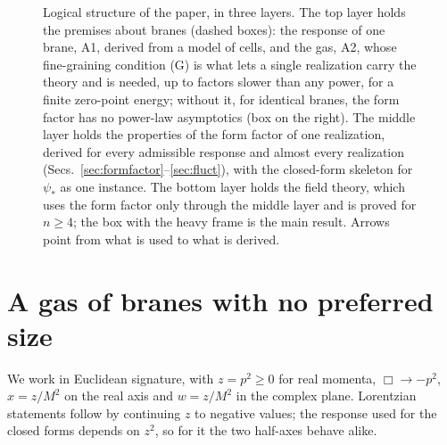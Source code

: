 \documentclass[aps,prd,10pt,twocolumn,superscriptaddress,nofootinbib,floatfix,longbibliography]{revtex4-2}
\newcommand{\bE}{\mathbb{E}}
\begin{document}
\begin{figure}[t]
\caption{Logical structure of the paper, in three layers. The top layer holds the premises about branes (dashed boxes): the response of one brane, A1, derived from a model of cells, and the gas, A2, whose fine-graining condition (G) is what lets a single realization carry the theory and is needed, up to factors slower than any power, for a finite zero-point energy; without it, for identical branes, the form factor has no power-law asymptotics (box on the right). The middle layer holds the properties of the form factor of one realization, derived for every admissible response and almost every realization (Secs.~\ref{sec:formfactor}--\ref{sec:fluct}), with the closed-form skeleton for $\psi_*$ as one instance. The bottom layer holds the field theory, which uses the form factor only through the middle layer and is proved for $n\ge4$; the box with the heavy frame is the main result. Arrows point from what is used to what is derived.}
\label{fig:logic}
\end{figure}

\section{A gas of branes with no preferred size}
\label{sec:gas}

We work in Euclidean signature, with $z=p^2\ge0$ for real momenta, $\Box\to-p^2$, $x=z/M^2$ on the real axis and $w=z/M^2$ in the complex plane. Lorentzian statements follow by continuing $z$ to negative values; the response used for the closed forms depends on $z^2$, so for it the two half-axes behave alike.
\end{document}
